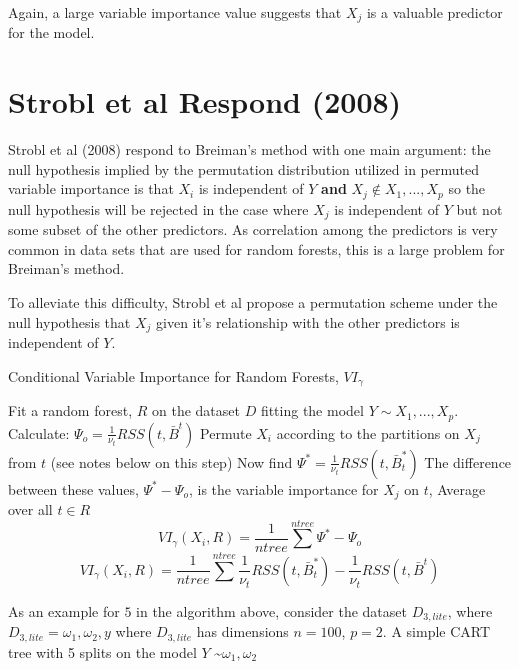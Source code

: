 \documentclass[12pt,twoside]{reedthesis}
\begin{document}
  Again, a large variable importance value suggests that \(X_j\) is a
  valuable predictor for the model.
  
  \section{Strobl et al Respond (2008)}\label{strobl-et-al-respond-2008}
  
  Strobl et al (2008) respond to Breiman's method with one main argument:
  the null hypothesis implied by the permutation distribution utilized in
  permuted variable importance is that \(X_i\) is independent of \(Y\)
  \textbf{and} \({X_j \notin X_1,...,X_p}\) so the null hypothesis will be
  rejected in the case where \(X_j\) is independent of \(Y\) but not some
  subset of the other predictors. As correlation among the predictors is
  very common in data sets that are used for random forests, this is a
  large problem for Breiman's method.
  
  To alleviate this difficulty, Strobl et al propose a permutation scheme
  under the null hypothesis that \(X_j\) given it's relationship with the
  other predictors is independent of \(Y\).
  
  \begin{algorithm}
  \caption{Conditional Variable Importance for Random Forests, $VI_{\gamma}$}
  \label{strobl}
  \begin{algorithmic}[1]
  \State Fit a random forest, $R$ on the dataset $D$ fitting the model $Y \sim X_1,...,X_p$.
  \State Calculate: $\Psi_o =  \frac 1 {\nu_t} RSS(t,\bar{B}^t)$
  \State Permute $X_i$ according to the partitions on $X_j$ from $t$ (see notes below on this step)
  Now find $\Psi^* =  \frac 1 {\nu_t} RSS(t,\bar{B}_t^*)$
  \State The difference between these values, $\Psi^* - \Psi_o$,  is the variable importance for $X_j$ on $t$,  
  \EndFor
  \State Average over all $t \in R$ 
   $$VI_{\gamma}(X_i,R) = \frac 1 {ntree} \sum^{ntree} \Psi^* - \Psi_o$$
   $$VI_{\gamma}(X_i, R) = \frac 1 {ntree} \sum^{ntree} \frac 1 {\nu_t} RSS(t,\bar{B}_t^*) - \frac 1 {\nu_t} RSS(t,\bar{B}^t)$$
  \EndFor
  \end{algorithmic}
  \end{algorithm}
  
  As an example for \(5\) in the algorithm above, consider the dataset
  \(D_{3,lite}\), where \(D_{3,lite} = {\omega_1, \omega_2, y}\) where
  \(D_{3,lite}\) has dimensions \(n = 100\), \(p = 2\). A simple CART tree
  with 5 splits on the model \(Y\) \textasciitilde{}\(\omega_1, \omega_2\)
  
\end{document}
